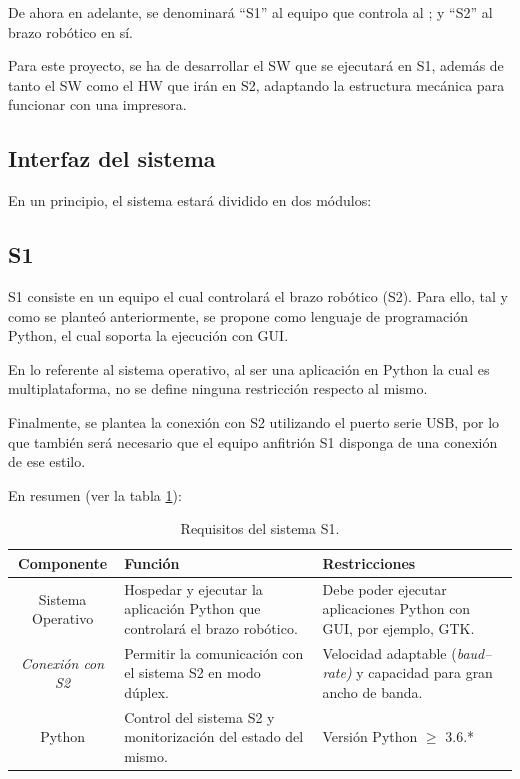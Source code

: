 De ahora en adelante, se denominará ``\ac{S1}'' al equipo que controla al \pArm{}; y ``\ac{S2}'' al brazo robótico en sí.

Para este proyecto, se ha de desarrollar el \ac{SW} que se ejecutará en \ac{S1}, además de tanto el \ac{SW} como el \ac{HW} que irán en \ac{S2}, adaptando la estructura mecánica para funcionar con una impresora.

\subsection{Interfaz del sistema}
En un principio, el sistema estará dividido en dos módulos:

\subsection*{\ac{S1}}
\ac{S1} consiste en un equipo el cual controlará el brazo robótico (\ac{S2}). Para ello, tal y como se planteó anteriormente, se propone como lenguaje de programación Python, el cual soporta la ejecución con \ac{GUI}.

En lo referente al sistema operativo, al ser una aplicación en Python la cual es multiplataforma, no se define ninguna restricción respecto al mismo.

Finalmente, se plantea la conexión con \ac{S2} utilizando el puerto serie \ac{USB}, por lo que también será necesario que el equipo anfitrión \ac{S1} disponga de una conexión de ese estilo.

En resumen (ver la tabla \ref{tab:s1_requirements}):

\begin{table}[H]
    \centering
    \begin{tabularx}{\textwidth}{| c | X | X |}
        \hline
        \textbf{Componente} & \textbf{Función} & \textbf{Restricciones} \\
        \hline\hline
        Sistema Operativo & Hospedar y ejecutar la aplicación Python que controlará el brazo robótico. & Debe poder ejecutar aplicaciones Python con \ac{GUI}, por ejemplo, \ac{GTK}. \\
        \hline
        \textit{Conexión con \ac{S2}} & Permitir la comunicación con el sistema \ac{S2} en modo dúplex. & Velocidad adaptable (\textit{baud--rate)} y capacidad para gran ancho de banda. \\
        \hline
        Python & Control del sistema \ac{S2} y monitorización del estado del mismo. & Versión Python $\geqslant$ 3.6.* \\
        \hline
    \end{tabularx}
    \caption{Requisitos del sistema \ac{S1}.}
    \label{tab:s1_requirements}
\end{table}

